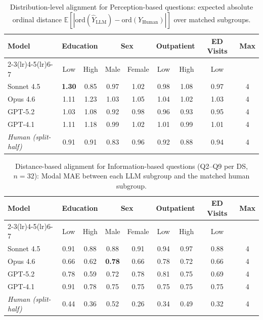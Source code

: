 \begin{table}[htbp]
\centering
\scriptsize
\setlength{\tabcolsep}{3.5pt}
\caption{Distribution-level alignment for Perception-based questions: expected absolute ordinal distance $\mathbb{E}[|\mathrm{ord}(\hat{Y}_{\mathrm{LLM}})-\mathrm{ord}(Y_{\mathrm{Human}})|]$ over matched subgroups.}
\label{tab:perc-expdist-alignment}
\begin{tabular}{lcccccccc}
\toprule
\textbf{Model}
& \multicolumn{2}{c}{\textbf{Education}}
& \multicolumn{2}{c}{\textbf{Sex}}
& \multicolumn{2}{c}{\textbf{Outpatient}}
& \textbf{ED Visits}
& \textbf{Max} \\
\cmidrule(lr){2-3}\cmidrule(lr){4-5}\cmidrule(lr){6-7}
& Low & High & Male & Female & Low & High & Low & \\
\midrule
Sonnet 4.5 & \textbf{1.30} & 0.85 & 0.97 & 1.02 & 0.98 & 1.08 & 0.97 & 4 \\
Opus 4.6 & 1.11 & 1.23 & 1.03 & 1.05 & 1.04 & 1.02 & 1.03 & 4 \\
GPT-5.2 & 1.03 & 1.08 & 0.92 & 0.98 & 0.96 & 0.93 & 0.95 & 4 \\
GPT-4.1 & 1.11 & 1.18 & 0.99 & 1.02 & 1.01 & 0.99 & 1.01 & 4 \\
\midrule
\textit{Human (split-half)} & 0.91 & 0.91 & 0.83 & 0.96 & 0.92 & 0.88 & 0.94 & 4 \\
\bottomrule
\end{tabular}
\end{table}

\begin{table}[htbp]
\centering
\scriptsize
\setlength{\tabcolsep}{3.5pt}
\caption{Distance-based alignment for Information-based questions (Q2--Q9 per DS, $n{=}32$): Modal MAE between each LLM subgroup and the matched human subgroup.}
\label{tab:info-distance-alignment}
\begin{tabular}{lcccccccc}
\toprule
\textbf{Model}
& \multicolumn{2}{c}{\textbf{Education}}
& \multicolumn{2}{c}{\textbf{Sex}}
& \multicolumn{2}{c}{\textbf{Outpatient}}
& \textbf{ED Visits}
& \textbf{Max} \\
\cmidrule(lr){2-3}\cmidrule(lr){4-5}\cmidrule(lr){6-7}
& Low & High & Male & Female & Low & High & Low & \\
\midrule
Sonnet 4.5 & 0.91 & 0.88 & 0.88 & 0.91 & 0.94 & 0.97 & 0.88 & 4 \\
Opus 4.6 & 0.66 & 0.62 & \textbf{0.78} & 0.66 & 0.78 & 0.72 & 0.66 & 4 \\
GPT-5.2 & 0.78 & 0.59 & 0.72 & 0.78 & 0.81 & 0.75 & 0.69 & 4 \\
GPT-4.1 & 0.91 & 0.78 & 0.75 & 0.75 & 0.75 & 0.75 & 0.75 & 4 \\
\midrule
\textit{Human (split-half)} & 0.44 & 0.36 & 0.52 & 0.26 & 0.34 & 0.49 & 0.32 & 4 \\
\bottomrule
\end{tabular}
\end{table}

